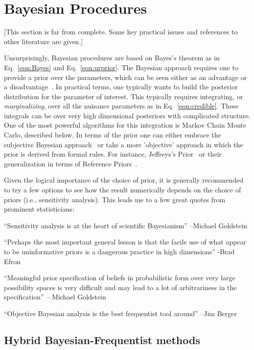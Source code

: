 \section{Bayesian Procedures}


[This section is far from complete.  Some key practical issues and references to other literature are given.]


Unsurprisingly, Bayesian procedures are based on Bayes's theorem as in Eq.~\ref{eqn:Bayes} and Eq.~\ref{eqn:urprior}.  The Bayesian approach requires one to provide a prior over the parameters, which can be seen either as an advantage or a disadvantage~\cite{DAgostiniInference,Cousins:1994yw}.  In practical terms, one typically wants to build the posterior distribution for the parameter of interest.  This typically requires integrating, or \textit{marginalizing}, over all the nuisance parameters as in Eq.~\ref{eqn:credible}.  These integrals can be over very high dimensional posteriors with complicated structure.  One of the most powerful algorithms for this integration is Markov Chain Monte Carlo, described below.  In terms of the prior one can either embrace the subjective Bayesian approach~\cite{Jaynes:2003fk} or take a more 'objective' approach in which the prior is derived from formal rules.  For instance, Jeffreys's Prior~\cite{JeffreysPrior} or their generalization in terms of Reference Priors~\cite{Demortier:2010sn}.  


Given the logical importance of the choice of prior, it is generally recommended to try a few options to see how the result numerically depends on the choice of priors (i.e.. sensitivity analysis).  This leads me to a few great quotes from prominent statisticians:


``Sensitivity analysis is at the heart of scientific Bayesianism'' --Michael Goldstein


``Perhaps the most important general lesson is that the facile use of what appear to be uninformative priors is a dangerous practice in high dimensions'' -Brad Efron


``Meaningful prior specification of beliefs in probabilistic form over very large possibility spaces is very difficult and may lead to a lot of arbitrariness in the specification'' -- Michael Goldstein


``Objective Bayesian analysis is the best frequentist tool around'' --Jim Berger


\subsection{Hybrid Bayesian-Frequentist methods}


